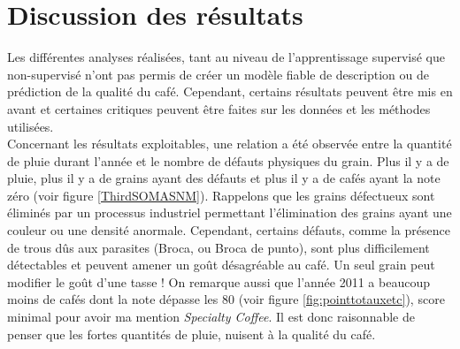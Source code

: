 \chapter{Discussion des résultats}










Les différentes analyses réalisées, tant au niveau de l'apprentissage supervisé que non-supervisé n'ont pas permis de créer un modèle fiable de description ou de prédiction de la qualité du café. Cependant, certains résultats peuvent être mis en avant et certaines critiques peuvent être faites sur les données et les méthodes utilisées. \\

\noindent Concernant les résultats exploitables, une relation a été observée entre la quantité de pluie durant l'année et le nombre de défauts physiques du grain. Plus il y a de pluie, plus il y a de grains ayant des défauts et plus il y a de cafés ayant la note zéro (voir figure \ref{ThirdSOMASNM}). Rappelons que les grains défectueux sont éliminés par un processus industriel permettant l'élimination des grains ayant une couleur ou une densité anormale. Cependant, certains défauts, comme la présence de trous dûs aux parasites (Broca, ou Broca de punto), sont plus difficilement détectables et peuvent amener un goût désagréable au café. Un seul grain peut modifier le goût d'une tasse ! On remarque aussi que l'année 2011 a beaucoup moins de cafés dont la note dépasse les 80 (voir figure \ref{fig:pointtotauxetc}), score minimal pour avoir ma mention \textit{Specialty Coffee}. Il est donc raisonnable de penser que les fortes quantités de pluie, nuisent à la qualité du café.  


